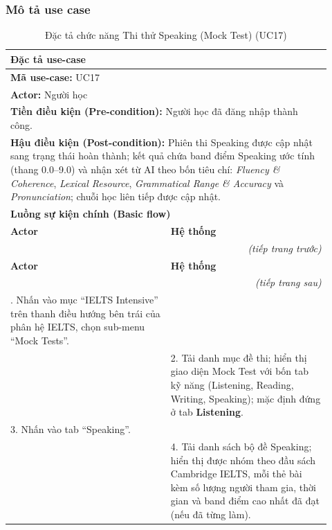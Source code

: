 \subsubsection{Mô tả use case}
\renewcommand{\arraystretch}{1.3}
\begin{longtable}{|p{0.46\linewidth}|p{0.46\linewidth}|}
    \caption{Đặc tả chức năng Thi thử Speaking (Mock Test) (UC17)} \label{tab:uc17_spec} \\
    \hline
    \multicolumn{2}{|l|}{\textbf{Đặc tả use-case}} \\ \hline
    \multicolumn{2}{|l|}{\textbf{Mã use-case:} UC17} \\ \hline
    \multicolumn{2}{|l|}{\textbf{Actor:} Người học} \\ \hline
    \multicolumn{2}{|p{0.88\linewidth}|}{\textbf{Tiền điều kiện (Pre-condition):} Người học đã đăng nhập thành công.} \\ \hline
    \multicolumn{2}{|p{0.88\linewidth}|}{\textbf{Hậu điều kiện (Post-condition):} Phiên thi Speaking được cập nhật sang trạng thái hoàn thành; kết quả chứa band điểm Speaking ước tính (thang 0.0--9.0) và nhận xét từ AI theo bốn tiêu chí: \textit{Fluency \& Coherence}, \textit{Lexical Resource}, \textit{Grammatical Range \& Accuracy} và \textit{Pronunciation}; chuỗi học liên tiếp được cập nhật.} \\ \hline
    \multicolumn{2}{|l|}{\textbf{Luồng sự kiện chính (Basic flow)}} \\ \hline
    \textbf{Actor} & \textbf{Hệ thống} \\ \hline
    \endfirsthead
    \multicolumn{2}{r}{\textit{(tiếp trang trước)}} \\
    \hline
    \textbf{Actor} & \textbf{Hệ thống} \\ \hline
    \endhead
    \hline
    \multicolumn{2}{r}{\textit{(tiếp trang sau)}} \\
    \endfoot
    \hline
    \endlastfoot
    1. Nhấn vào mục ``IELTS Intensive'' trên thanh điều hướng bên trái của phân hệ IELTS, chọn sub-menu ``Mock Tests''. & \\ \hline
    & 2. Tải danh mục đề thi; hiển thị giao diện Mock Test với bốn tab kỹ năng (Listening, Reading, Writing, Speaking); mặc định đứng ở tab \textbf{Listening}. \\ \hline
    3. Nhấn vào tab ``Speaking''. & \\ \hline
    & 4. Tải danh sách bộ đề Speaking; hiển thị được nhóm theo đầu sách Cambridge IELTS, mỗi thẻ bài kèm số lượng người tham gia, thời gian và band điểm cao nhất đã đạt (nếu đã từng làm). \\ \hline

\end{longtable}
